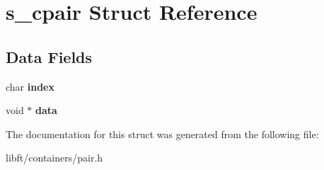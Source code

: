 \hypertarget{structs__cpair}{}\section{s\+\_\+cpair Struct Reference}
\label{structs__cpair}
\subsection*{Data Fields}
\begin{DoxyCompactItemize}
\item 
\hypertarget{structs__cpair_a8f564a8b3781dfabef60c05915da85f8}{}char {\bfseries index}\label{structs__cpair_a8f564a8b3781dfabef60c05915da85f8}

\item 
\hypertarget{structs__cpair_a735984d41155bc1032e09bece8f8d66d}{}void $\ast$ {\bfseries data}\label{structs__cpair_a735984d41155bc1032e09bece8f8d66d}

\end{DoxyCompactItemize}


The documentation for this struct was generated from the following file\+:\begin{DoxyCompactItemize}
\item 
libft/containers/pair.\+h\end{DoxyCompactItemize}
